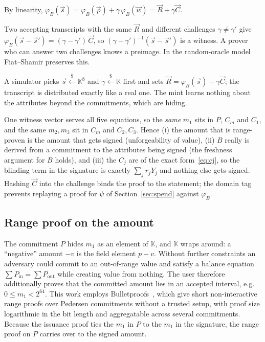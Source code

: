 \documentclass[10pt,a5paper]{article}
\newcommand{\K}[1]{#1}                      %
\newcommand{\Go}[1]{#1}                     %
\newcommand{\K}[1]{{\color{ScalarCol}#1}}   %
\newcommand{\Go}[1]{{\color{GoneCol}#1}}    %
\newcommand{\F}{\mathbb{K}}
\newcommand{\vv}[1]{\vec{#1}}
\newcommand{\sample}{\stackrel{\$}{\leftarrow}}
\begin{document}
\begin{whybox}
\begin{description}[nosep,leftmargin=1.2em]
\item[Completeness.] By linearity,
  $\varphi_{\Go{B}}(\vv{s}) = \varphi_{\Go{B}}(\vv{\rho}) + \K{\gamma}\,\varphi_{\Go{B}}(\vv{w}) = \vv{R} + \K{\gamma}\vv{C}$.
\item[Knowledge (special soundness).] Two accepting transcripts with the same
  $\vv{R}$ and different challenges $\K{\gamma} \neq \K{\gamma'}$ give
  $\varphi_{\Go{B}}(\vv{s}-\vv{s}') = (\K{\gamma}-\K{\gamma'})\,\vv{C}$, so
  $(\K{\gamma}-\K{\gamma'})^{-1}(\vv{s}-\vv{s}')$ is a witness. A prover who can
  answer two challenges knows a preimage. In the random-oracle model
  Fiat--Shamir preserves this.
\item[Zero knowledge.] A simulator picks $\vv{s} \sample \F^8$ and
  $\K{\gamma} \sample \F$ first and sets $\vv{R} = \varphi_{\Go{B}}(\vv{s}) - \K{\gamma}\vv{C}$;
  the transcript is distributed exactly like a real one. The mint learns
  nothing about the attributes beyond the commitments, which are hiding.
\item[What the single witness buys us.] One witness vector serves all five
  equations, so the \emph{same} $\K{m_1}$ sits in $\Go{P}$, $\Go{C_m}$ and $\Go{C_1}$,
  and the same $\K{m_2},\K{m_3}$ sit in $\Go{C_m}$ and $\Go{C_2},\Go{C_3}$. Hence
  (i) the amount that is range-proven is the amount that gets signed
  (unforgeability of value), (ii) $\Go{B}$ really is derived from a commitment
  to the attributes being signed (the freshness argument for $\Go{B}$ holds),
  and (iii) the $\Go{C_j}$ are of the exact form~\eqref{eq:cj}, so the
  blinding term in the signature is exactly $\sum_j \K{r_j}\Go{Y_j}$ and
  nothing else gets signed. Hashing $\vv{C}$ into the challenge binds the proof
  to the statement; the domain tag prevents replaying a proof for $\psi$ of
  Section~\ref{sec:spend} against $\varphi_{\Go{B}}$.
\end{description}
\end{whybox}

\subsection{Range proof on the amount}
\label{sec:range}

The commitment $\Go{P}$ hides $\K{m_1}$ as an element of $\F$, and $\F$ wraps
around: a ``negative'' amount $-\K{v}$ is the field element $p - \K{v}$. Without
further constraints an adversary could commit to an out-of-range value and
satisfy a balance equation $\sum \Go{P}_{\mathrm{in}} = \sum \Go{P}_{\mathrm{out}}$
while creating value from nothing. The user therefore additionally proves that
the committed amount lies in an accepted interval, e.g.\ $0 \le \K{m_1} < 2^{64}$.
This work employs Bulletproofs~\cite{bulletproofs}, which give short
non-interactive range proofs over Pedersen commitments without a trusted setup,
with proof size logarithmic in the bit length and aggregatable across several
commitments. Because the issuance proof ties the $\K{m_1}$ in $\Go{P}$ to the
$\K{m_1}$ in the signature, the range proof on $\Go{P}$ carries over to the
signed amount.
\end{document}
